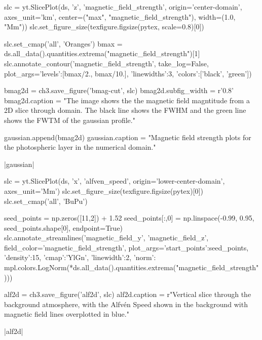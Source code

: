 \begin{pycode}[chapter3]
slc = yt.SlicePlot(ds, 'z', 'magnetic_field_strength', origin='center-domain',
axes_unit='km', center=("max", "magnetic_field_strength"), width=(1.0, "Mm"))
slc.set_figure_size(texfigure.figsize(pytex, scale=0.8)[0])

slc.set_cmap('all', 'Oranges')
bmax = ds.all_data().quantities.extrema("magnetic_field_strength")[1]
slc.annotate_contour('magnetic_field_strength', take_log=False,
plot_args={'levels':[bmax/2., bmax/10.],
'linewidths':3,
'colors':['black', 'green']})

bmag2d = ch3.save_figure('bmag-cut', slc)
bmag2d.subfig_width = r'0.8\columnwidth'
bmag2d.caption = "The image shows the the magnetic field magntitude from a 2D slice through domain. The black line shows the FWHM and the green line shows the FWTM of the gaussian profile."

gaussian.append(bmag2d)
gaussian.caption = "Magnetic field strength plots for the photospheric layer in the numerical domain."

\end{pycode}


\py[chapter3]|gaussian|

\begin{pycode}[chapter3]
slc = yt.SlicePlot(ds, 'x', 'alfven_speed', origin='lower-center-domain', axes_unit='Mm')
slc.set_figure_size(texfigure.figsize(pytex)[0])
slc.set_cmap('all', 'BuPu')

seed_points = np.zeros([11,2]) + 1.52
seed_points[:,0] = np.linspace(-0.99, 0.95, seed_points.shape[0], endpoint=True)
slc.annotate_streamlines('magnetic_field_y', 'magnetic_field_z', field_color='magnetic_field_strength',
plot_args={'start_points':seed_points, 'density':15, 'cmap':'YlGn', 'linewidth':2,
'norm': mpl.colors.LogNorm(*ds.all_data().quantities.extrema("magnetic_field_strength"))})

alf2d = ch3.save_figure('alf2d', slc)
alf2d.caption = r"Vertical slice through the background atmosphere, with the Alfv\'en Speed shown in the background with magnetic field lines overplotted in blue."
\end{pycode}

\py[chapter3]|alf2d|

